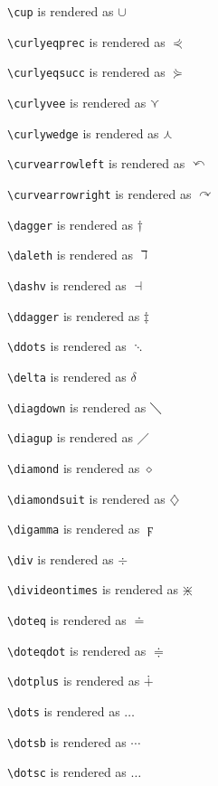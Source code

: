 \texttt{\textbackslash cup} is rendered as $\cup$

\texttt{\textbackslash curlyeqprec} is rendered as $\curlyeqprec$

\texttt{\textbackslash curlyeqsucc} is rendered as $\curlyeqsucc$

\texttt{\textbackslash curlyvee} is rendered as $\curlyvee$

\texttt{\textbackslash curlywedge} is rendered as $\curlywedge$

\texttt{\textbackslash curvearrowleft} is rendered as $\curvearrowleft$

\texttt{\textbackslash curvearrowright} is rendered as $\curvearrowright$

\texttt{\textbackslash dagger} is rendered as $\dagger$

\texttt{\textbackslash daleth} is rendered as $\daleth$

\texttt{\textbackslash dashv} is rendered as $\dashv$

\texttt{\textbackslash ddagger} is rendered as $\ddagger$

\texttt{\textbackslash ddots} is rendered as $\ddots$

\texttt{\textbackslash delta} is rendered as $\delta$

\texttt{\textbackslash diagdown} is rendered as $\diagdown$

\texttt{\textbackslash diagup} is rendered as $\diagup$

\texttt{\textbackslash diamond} is rendered as $\diamond$

\texttt{\textbackslash diamondsuit} is rendered as $\diamondsuit$

\texttt{\textbackslash digamma} is rendered as $\digamma$

\texttt{\textbackslash div} is rendered as $\div$

\texttt{\textbackslash divideontimes} is rendered as $\divideontimes$

\texttt{\textbackslash doteq} is rendered as $\doteq$

\texttt{\textbackslash doteqdot} is rendered as $\doteqdot$

\texttt{\textbackslash dotplus} is rendered as $\dotplus$

\texttt{\textbackslash dots} is rendered as $\dots$

\texttt{\textbackslash dotsb} is rendered as $\dotsb$

\texttt{\textbackslash dotsc} is rendered as $\dotsc$

